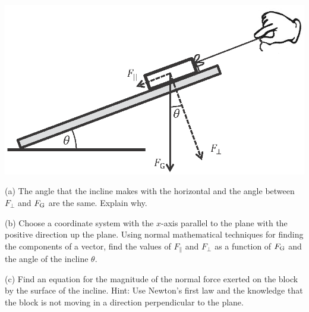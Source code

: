 \vspace{0.3cm}
{\par\centering \includegraphics{newton/newton_fig10_new.eps} \par}
\vspace{0.3cm}


(a) The angle that the incline makes with the horizontal and the angle between
\( {F}_{{\perp}} \) and \(F_{\rm G} \) are the same. Explain why.
\vspace{20mm}

(b) Choose a coordinate system with the $x$-axis parallel to the plane with the
positive direction up the plane. Using normal mathematical techniques for finding the components of a vector, find the values of 
\( F_{\parallel} \) and \( F_{\perp} \)
as a function of \( F_{\rm G} \) and the angle of the incline \( \theta  \).
\vspace{20mm}

(c) Find an equation for the magnitude of the normal force exerted on the
block by the surface of the incline. Hint: Use Newton's first law and the knowledge that the block is not moving in a direction perpendicular to the plane.

